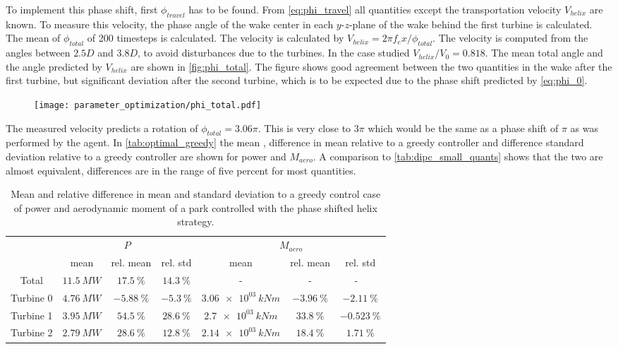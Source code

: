 To implement this phase shift, first $\phi_{travel}$ has to be found. From \eqref{eq:phi_travel} all quantities except the transportation velocity $V_{helix}$ are known. To measure this velocity, the phase angle of the wake center in each $y$-$z$-plane of the wake behind the first turbine is calculated. The mean of $\phi_{total}$ of 200 timesteps is calculated. The velocity is calculated by $V_{helix} = 2\pi f_e x/\phi_{total}$. The velocity is computed from the angles between $2.5D$ and $3.8D$, to avoid disturbances due to the turbines. In the case studied $V_{helix}/V_0 = 0.818$. The mean total angle and the angle predicted by $V_{helix}$ are shown in \autoref{fig:phi_total}. The figure shows good agreement between the two quantities in the wake after the first turbine, but significant deviation after the second turbine, which is to be expected due to the phase shift predicted by \eqref{eq:phi_0}.
\begin{figure}[h]
	\centering
	\texttt{[image: parameter\_optimization/phi\_total.pdf]}
	\caption{}
	\label{fig:phi_total}
\end{figure}
The measured velocity predicts a rotation of $\phi_{total}=3.06\pi$. This is very close to $3\pi$ which would be the same as a phase shift of $\pi$ as was performed by the agent. In \autoref{tab:optimal_greedy} the mean , difference in mean relative to a greedy controller and difference standard deviation relative to a greedy controller are shown for power and $M_{aero}$. A comparison to \autoref{tab:dipc_small_quants} shows that the two are almost equivalent, differences are in the range of five percent for most quantities.
\begin{table}[h]
	\centering
	\caption{Mean and relative difference in mean and standard deviation to a greedy control case of power and aerodynamic moment of a park controlled with the phase shifted helix strategy.}
	\begin{tabular}{ccccccc}
		\toprule
		& \multicolumn{3}{c}{$P$}  & \multicolumn{3}{c}{$M_{aero}$ }\\ \cmidrule(rl){2-4} \cmidrule(rl){5-7}
		& mean & rel. mean & rel. std  & mean & rel. mean & rel. std \\ \midrule
		Total & $\SI{  11.5}{MW} $ & $\SI{ +17.5}{\%}$ & $\SI{ +14.3}{\%}$ &-&-&- \
		\\
		Turbine 0  & $\SI{  4.76}{MW} $ & $\SI{ -5.88}{\%}$ & $\SI{  -5.3}{\%}$ & $\SI{3.06e03}{kNm} $ & $\SI{ -3.96}{\%}$ & $\SI{ -2.11}{\%}$ \\
		Turbine 1  & $\SI{  3.95}{MW} $ & $\SI{ +54.5}{\%}$ & $\SI{ +28.6}{\%}$ & $\SI{2.7e03}{kNm} $ & $\SI{ +33.8}{\%}$ & $\SI{-0.523}{\%}$ \\
		Turbine 2  & $\SI{  2.79}{MW} $ & $\SI{ +28.6}{\%}$ & $\SI{ +12.8}{\%}$ & $\SI{2.14e03}{kNm} $ & $\SI{ +18.4}{\%}$ & $\SI{ +1.71}{\%}$ \\
		\bottomrule
	\end{tabular}
	\label{tab:optimal_greedy}
\end{table} \\
